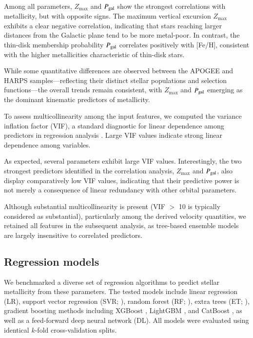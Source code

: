 \documentclass{aa}
\begin{document}
Among all parameters, $Z_{\max}$ and $P_{\rm gal}$ show the strongest correlations with metallicity, but with opposite signs. The maximum vertical excursion $Z_{\max}$ exhibits a clear negative correlation, indicating that stars reaching larger distances from the Galactic plane tend to be more metal-poor. In contrast, the thin-disk membership probability $P_{\rm gal}$ correlates positively with [Fe/H], consistent with the higher metallicities characteristic of thin-disk stars.

While some quantitative differences are observed between the APOGEE and HARPS samples—reflecting their distinct stellar populations and selection functions—the overall trends remain consistent, with $Z_{\max}$ and $P_{\rm gal}$ emerging as the dominant kinematic predictors of metallicity.

To assess multicollinearity among the input features, we computed the variance inflation factor (VIF), a standard diagnostic for linear dependence among predictors in regression analysis \citep{farrar1967}. Large VIF values indicate strong linear dependence among variables.

As expected, several parameters exhibit large VIF values. Interestingly, the two strongest predictors identified in the correlation analysis, $Z_{\max}$ and $P_{\rm gal}$, also display comparatively low VIF values, indicating that their predictive power is not merely a consequence of linear redundancy with other orbital parameters.

Although substantial multicollinearity is present (VIF $>$ 10 is typically considered as substantial), particularly among the derived velocity quantities, we retained all features in the subsequent analysis, as tree-based ensemble models are largely insensitive to correlated predictors. 


\subsection{Regression models}

We benchmarked a diverse set of regression algorithms to predict stellar metallicity from these parameters. The tested models include linear regression (LR), support vector regression (SVR; \citealt{cortes1995}), random forest (RF; \citealt{breiman2001}), extra trees (ET; \citealt{geurts2006}), gradient boosting methods including XGBoost \citep{chen2016}, LightGBM \citep{ke2017}, and CatBoost \citep{prokhorenkova2018}, as well as a feed-forward deep neural network (DL). All models were evaluated using identical $k$-fold cross-validation splits.
\end{document}
